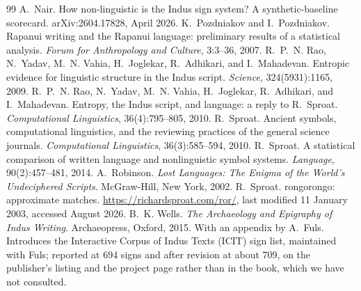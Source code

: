 \documentclass[11pt,a4paper]{article}
\begin{document}
\begin{thebibliography}{99}
 A.~Nair. How non-linguistic is the Indus sign system? A synthetic-baseline scorecard. arXiv:2604.17828, April 2026.
 K.~Pozdniakov and I.~Pozdniakov. Rapanui writing and the Rapanui language: preliminary results of a statistical analysis. \emph{Forum for Anthropology and Culture}, 3:3--36, 2007.
 R.~P.~N. Rao, N.~Yadav, M.~N. Vahia, H.~Joglekar, R.~Adhikari, and I.~Mahadevan. Entropic evidence for linguistic structure in the Indus script. \emph{Science}, 324(5931):1165, 2009.
 R.~P.~N. Rao, N.~Yadav, M.~N. Vahia, H.~Joglekar, R.~Adhikari, and I.~Mahadevan. Entropy, the Indus script, and language: a reply to R.~Sproat. \emph{Computational Linguistics}, 36(4):795--805, 2010.
 R.~Sproat. Ancient symbols, computational linguistics, and the reviewing practices of the general science journals. \emph{Computational Linguistics}, 36(3):585--594, 2010.
 R.~Sproat. A statistical comparison of written language and nonlinguistic symbol systems. \emph{Language}, 90(2):457--481, 2014.
 A.~Robinson. \emph{Lost Languages: The Enigma of the World's Undeciphered Scripts}. McGraw-Hill, New York, 2002.
 R.~Sproat. rongorongo: approximate matches. \url{https://richardsproat.com/ror/}, last modified 11 January 2003, accessed August 2026.
 B.~K. Wells. \emph{The Archaeology and Epigraphy of Indus Writing}. Archaeopress, Oxford, 2015. With an appendix by A.~Fuls. Introduces the Interactive Corpus of Indus Texts (ICIT) sign list, maintained with Fuls; reported at 694 signs and after revision at about 709, on the publisher's listing and the project page rather than in the book, which we have not consulted.
\end{thebibliography}
\end{document}
